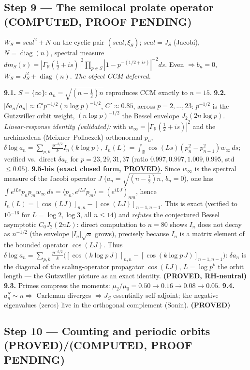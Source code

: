 \documentclass[11pt]{article}
\theoremstyle{remark}
\newcommand{\PROVED}{\textbf{(PROVED)}}
\newcommand{\COMP}{\textbf{(COMPUTED, PROOF PENDING)}}
\begin{document}
\subsection{Step 9 --- The semilocal prolate operator \COMP}

$W_S=scal^2+N$ on the cyclic pair $(scal,\xi_S)$; $scal=J_S$ (Jacobi), $N=\operatorname{diag}(n)$,
spectral measure
$dm_S(s)=|\Gamma_{\mathbb R}(\tfrac12+is)|^2\prod_{p\in S}|1-p^{-(1/2+is)}|^{-2}ds$. Even
$\Rightarrow b_n=0$, $W_S=J_S^2+\operatorname{diag}(n)$. \emph{The object CCM deferred.}

\textbf{9.1.} $S=\{\infty\}$: $a_n=\sqrt{(n-\tfrac12)n}$ reproduces CCM exactly to $n=15$.
\textbf{9.2.} $|\delta a_n/a_n|\approx C'p^{-1/2}(n\log p)^{-1/2}$, $C'\approx0.85$, across
$p=2,\dots,23$: $p^{-1/2}$ is the Gutzwiller orbit weight, $(n\log p)^{-1/2}$ the Bessel envelope
$J_2(2n\log p)$. \emph{Linear-response identity (validated):} with $w_\infty=|\Gamma_{\mathbb
R}(\tfrac12+is)|^2$ and the archimedean (Meixner--Pollaczek) orthonormal $p_n$,
$\delta\log a_n=\sum_{p,k}\tfrac{p^{-k/2}}{k}I_n(k\log p)$,
$I_n(L)=\int_{\mathbb R}\cos(Ls)(p_n^2-p_{n-1}^2)w_\infty\,ds$; verified vs.\ direct $\delta a_n$ for
$p=23,29,31,37$ (ratio $0.997,0.997,1.009,0.995$, std $\le0.05$).
\textbf{9.5-bis (exact closed form, PROVED).} Since $w_\infty$ is the spectral measure of the
Jacobi operator $J$ ($a_n=\sqrt{(n-\tfrac12)n}$, $b_n=0$), one has
$\int e^{iLs}p_np_m w_\infty\,ds=\langle p_n,e^{iLJ}p_m\rangle=(e^{iLJ})_{nm}$, hence
$\boxed{I_n(L)=[\cos(LJ)]_{n,n}-[\cos(LJ)]_{n-1,n-1}}$. This is exact (verified to $10^{-16}$ for
$L=\log2,\log3$, all $n\le14$) and \emph{refutes} the conjectured Bessel asymptotic
$C_0J_2(2nL)$: direct computation to $n=80$ shows $I_n$ does not decay as $n^{-1/2}$ (the
envelope $|I_n|\sqrt n$ grows), precisely because $I_n$ is a matrix element of the bounded
operator $\cos(LJ)$. Thus
$\delta\log a_n=\sum_{p,k}\tfrac{p^{-k/2}}{k}\bigl([\cos(k\log p\,J)]_{n,n}-[\cos(k\log
p\,J)]_{n-1,n-1}\bigr)$: $\delta a_n$ is the diagonal of the scaling-operator propagator
$\cos(LJ)$, $L=\log p^k$ the orbit length --- the Gutzwiller picture as an exact identity.
\textbf{(PROVED, RH-neutral)}
\textbf{9.3.} Primes compress the moments: $\mu_2/\mu_0=0.50\to0.16\to0.08\to0.05$.
\textbf{9.4.} $a_n^S\sim n\Rightarrow$ Carleman diverges $\Rightarrow J_S$ essentially
self-adjoint; the negative eigenvalues (zeros) live in the orthogonal complement (Sonin).
\PROVED

\subsection{Step 10 --- Counting and periodic orbits \PROVED/\COMP}
\end{document}
